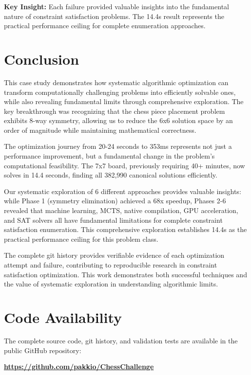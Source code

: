 \documentclass[12pt,a4paper]{article}
\theoremstyle{definition}
\begin{document}
\textbf{Key Insight:} Each failure provided valuable insights into the fundamental nature of constraint satisfaction problems. The 14.4s result represents the practical performance ceiling for complete enumeration approaches.

\section{Conclusion}

This case study demonstrates how systematic algorithmic optimization can transform computationally challenging problems into efficiently solvable ones, while also revealing fundamental limits through comprehensive exploration. The key breakthrough was recognizing that the chess piece placement problem exhibits 8-way symmetry, allowing us to reduce the 6x6 solution space by an order of magnitude while maintaining mathematical correctness.

The optimization journey from 20-24 seconds to 353ms represents not just a performance improvement, but a fundamental change in the problem's computational feasibility. The 7x7 board, previously requiring 40+ minutes, now solves in 14.4 seconds, finding all 382,990 canonical solutions efficiently.

Our systematic exploration of 6 different approaches provides valuable insights: while Phase 1 (symmetry elimination) achieved a 68x speedup, Phases 2-6 revealed that machine learning, MCTS, native compilation, GPU acceleration, and SAT solvers all have fundamental limitations for complete constraint satisfaction enumeration. This comprehensive exploration establishes 14.4s as the practical performance ceiling for this problem class.

The complete git history provides verifiable evidence of each optimization attempt and failure, contributing to reproducible research in constraint satisfaction optimization. This work demonstrates both successful techniques and the value of systematic exploration in understanding algorithmic limits.

\section{Code Availability}

The complete source code, git history, and validation tests are available in the public GitHub repository:

\begin{center}
\textbf{\url{https://github.com/pakkio/ChessChallenge}}
\end{center}
\end{document}
